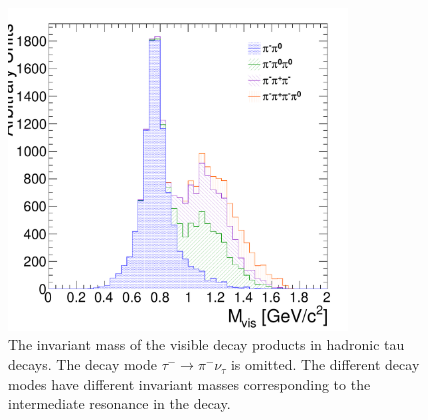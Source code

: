 \begin{figure}[thbp]
   \begin{center}
      \includegraphics[width=90mm]{figures/truthIMvsDM.pdf}
   \end{center}
   \caption{The invariant mass of the visible decay products in hadronic tau
   decays.  The decay mode $\tau^{-} \rightarrow \pi^{-} \nu_\tau$ is omitted.
   The different decay modes have different invariant masses corresponding to
   the intermediate resonance in the decay.}
   \label{fig:trueInvMass}
\end{figure}
